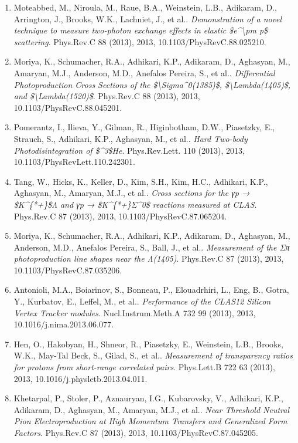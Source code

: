 \begin{enumerate}
\item Moteabbed, M., Niroula, M., Raue, B.A., Weinstein, L.B., Adikaram, D., Arrington, J., Brooks, W.K., Lachniet, J., et al.. \textit{Demonstration of a novel technique to measure two-photon exchange effects in elastic \$e\textasciicircum{}\textbackslash{}pm p\$ scattering}. Phys.Rev.C 88 (2013), 2013, 10.1103/PhysRevC.88.025210.
\item Moriya, K., Schumacher, R.A., Adhikari, K.P., Adikaram, D., Aghasyan, M., Amaryan, M.J., Anderson, M.D., Anefalos Pereira, S., et al.. \textit{Differential Photoproduction Cross Sections of the \$\textbackslash{}Sigma\textasciicircum{}0(1385)\$, \$\textbackslash{}Lambda(1405)\$, and \$\textbackslash{}Lambda(1520)\$}. Phys.Rev.C 88 (2013), 2013, 10.1103/PhysRevC.88.045201.
\item Pomerantz, I., Ilieva, Y., Gilman, R., Higinbotham, D.W., Piasetzky, E., Strauch, S., Adhikari, K.P., Aghasyan, M., et al.. \textit{Hard Two-body Photodisintegration of \$\textasciicircum{}3\$He}. Phys.Rev.Lett. 110 (2013), 2013, 10.1103/PhysRevLett.110.242301.
\item Tang, W., Hicks, K., Keller, D., Kim, S.H., Kim, H.C., Adhikari, K.P., Aghasyan, M., Amaryan, M.J., et al.. \textit{Cross sections for the γp → \$K\textasciicircum{}\{*+\}\$Λ and γp → \$K\textasciicircum{}\{*+\}Σ\textasciicircum{}0\$ reactions measured at CLAS}. Phys.Rev.C 87 (2013), 2013, 10.1103/PhysRevC.87.065204.
\item Moriya, K., Schumacher, R.A., Adhikari, K.P., Adikaram, D., Aghasyan, M., Anderson, M.D., Anefalos Pereira, S., Ball, J., et al.. \textit{Measurement of the Σπ photoproduction line shapes near the Λ(1405)}. Phys.Rev.C 87 (2013), 2013, 10.1103/PhysRevC.87.035206.
\item Antonioli, M.A., Boiarinov, S., Bonneau, P., Elouadrhiri, L., Eng, B., Gotra, Y., Kurbatov, E., Leffel, M., et al.. \textit{Performance of the CLAS12 Silicon Vertex Tracker modules}. Nucl.Instrum.Meth.A 732 99 (2013), 2013, 10.1016/j.nima.2013.06.077.
\item Hen, O., Hakobyan, H., Shneor, R., Piasetzky, E., Weinstein, L.B., Brooks, W.K., May-Tal Beck, S., Gilad, S., et al.. \textit{Measurement of transparency ratios for protons from short-range correlated pairs}. Phys.Lett.B 722 63 (2013), 2013, 10.1016/j.physletb.2013.04.011.
\item Khetarpal, P., Stoler, P., Aznauryan, I.G., Kubarovsky, V., Adhikari, K.P., Adikaram, D., Aghasyan, M., Amaryan, M.J., et al.. \textit{Near Threshold Neutral Pion Electroproduction at High Momentum Transfers and Generalized Form Factors}. Phys.Rev.C 87 (2013), 2013, 10.1103/PhysRevC.87.045205.

\end{enumerate}
